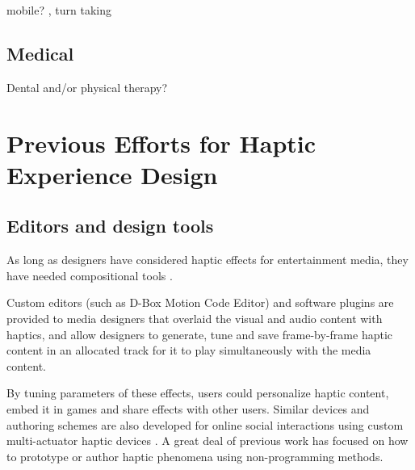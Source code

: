 \cite{Brunet2013a}

mobile? \cite{Brown2006b}, turn taking \cite{Chan2008}


\subsection{Medical}
Dental and/or physical therapy?



%
%
\section{Previous Efforts for Haptic Experience Design}

\subsection{Editors and design tools}
As long as designers have considered haptic effects for entertainment media, they have needed compositional tools %
\cite{Gunther2002}.

Custom editors (such as D-Box Motion Code Editor) and software plugins are provided to media designers that overlaid the visual and audio content with haptics, and allow designers to generate, tune and save frame-by-frame haptic content in an allocated track for it to play simultaneously with the media content. 

By tuning parameters of these effects, users could personalize  haptic content, embed it in games and share effects with other users.
Similar devices and authoring schemes are also developed for online social interactions using custom multi-actuator haptic devices \cite{Kim2009,Tsetserukou2009,Paneels2013}.%
A great deal of previous work has focused on how to prototype or author haptic phenomena using non-programming methods. 

